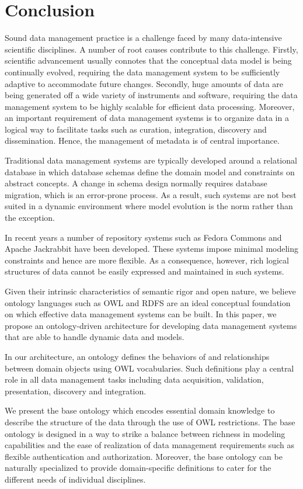 \documentclass{elsarticle}
\begin{document}
\section{Conclusion}\label{sec:conclusion}
Sound data management practice is a challenge faced by
many data-intensive scientific disciplines. A number of
root causes contribute to this challenge.
Firstly, scientific advancement
usually connotes that the conceptual data model is being
continually evolved, requiring the data management system
to be sufficiently adaptive to accommodate future changes.
Secondly, huge amounts of data are being generated off a
wide variety of instruments and software, requiring the data
management system to be highly scalable for efficient data
processing. Moreover, an important requirement of data management
systems is to organize data in a logical way to facilitate
tasks such as curation, integration, discovery and dissemination.
Hence, the management of metadata is of central importance.

Traditional data management systems are typically developed
around a relational database in which database schemas
define the domain model and constraints on
abstract concepts. A change in schema design normally
requires database migration, which is an error-prone
process. As a result, such systems are not best
suited in a dynamic environment where model evolution is
the norm rather than the exception.

In recent years a number of repository systems such as
Fedora Commons and Apache Jackrabbit have been developed.
These systems impose minimal modeling constraints and hence
are more flexible. As a consequence, however, rich logical
structures of data cannot be easily expressed and maintained
in such systems.

Given their intrinsic characteristics of semantic rigor and
open nature, we believe ontology languages such as OWL and
RDFS are an ideal conceptual foundation on which effective
data management systems can be built. In this paper, we
propose an ontology-driven architecture for developing data
management systems that are able to handle dynamic data and models.

In our architecture, an ontology defines the behaviors of and
relationships between domain objects using OWL vocabularies. Such
definitions play a central role in all data management tasks
including data acquisition, validation, presentation, discovery and
integration.

We present the base ontology which encodes essential domain
knowledge to describe the structure of the data through the use of
OWL restrictions. The base ontology is designed in a way to strike a
balance between richness in modeling capabilities and the ease of
realization of data management requirements such as flexible
authentication and authorization. Moreover, the base ontology can be
naturally specialized to provide domain-specific definitions to
cater for the different needs of individual disciplines.
\end{document}
